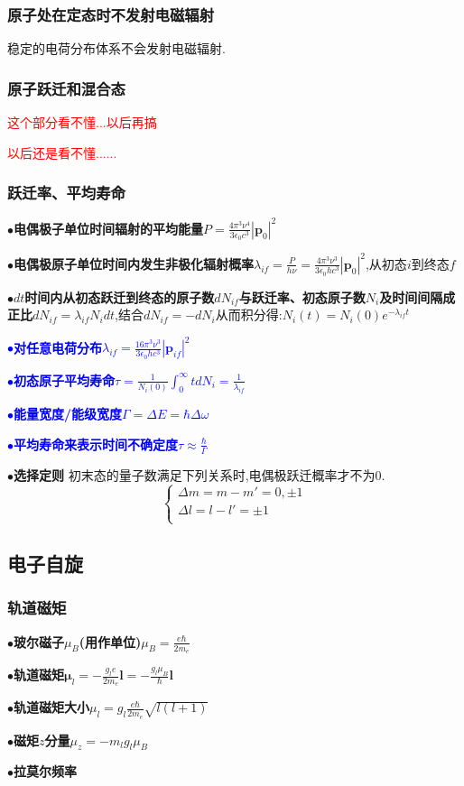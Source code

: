 \documentclass[UTF8]{article}
\newcommand{\keypoint}[2]{$\bullet$\textbf{#1}\quad#2\par}
\begin{document}
\subsubsection{原子处在定态时不发射电磁辐射}
稳定的电荷分布体系不会发射电磁辐射.\par
\subsubsection{原子跃迁和混合态}
%
%
\textcolor{red}{这个部分看不懂...以后再搞}\par
\textcolor{red}{以后还是看不懂......}\par
\subsubsection{跃迁率、平均寿命}
\keypoint{电偶极子单位时间辐射的平均能量}{$P=\frac{4\pi^3\nu^4}{3\epsilon_{0}c^3}\left|\bm{p}_0\right|^2$}
\keypoint{电偶极原子单位时间内发生非极化辐射概率}{$\lambda_{if}=\frac{P}{h\nu}=\frac{4\pi^3\nu^3}{3\epsilon_{0}hc^3}\left|\bm{p}_0\right|^2$,从初态$i$到终态$f$}
\keypoint{$dt$时间内从初态跃迁到终态的原子数$dN_{if}$与跃迁率、初态原子数$N_i$及时间间隔成正比}{$dN_{if}=\lambda_{if}N_idt$,结合$dN_{if}=-dN_i$从而积分得:{$N_i(t)=N_i(0)e^{-\lambda_{if}t}$}}
\textcolor{blue}{\keypoint{对任意电荷分布}{$\lambda_{if}=\frac{16\pi^3\nu^3}{3\epsilon_0hc^3}|\bm{p}_{if}|^2$}}
\textcolor{blue}{\keypoint{初态原子平均寿命}{$\tau=\frac{1}{N_i(0)}\int_{0}^{\infty}tdN_i=\frac{1}{\lambda_{if}}$}}
\textcolor{blue}{\keypoint{能量宽度/能级宽度}{$\Gamma=\Delta E=\hbar\Delta\omega$}}
\textcolor{blue}{\keypoint{平均寿命来表示时间不确定度}{$\tau\approx\frac{\hbar}{\Gamma}$}}
\keypoint{\textbf{选择定则}}{
	初末态的量子数满足下列关系时,电偶极跃迁概率才不为0.
	$$ \left\{
	\begin{array}{l}
	\Delta m = m-m'=0,\pm1\\
	\Delta l = l-l'=\pm1\\
	\end{array}
	\right .$$
}

\subsection{电子自旋}
\subsubsection{轨道磁矩}
\keypoint{玻尔磁子$\mu_{B}$(用作单位)}{$\mu_{B}=\frac{e\hbar}{2m_e}$}
\keypoint{轨道磁矩}{$\bm{\mu}_{l}=-\frac{g_le}{2m_e}\bm{l}=-\frac{g_l\mu_B}{\hbar}\bm{l}$}
\keypoint{轨道磁矩大小}{$\mu_{l}=g_l\frac{e\hbar}{2m_e}\sqrt{l(l+1)}$}
\keypoint{磁矩$z$分量}{$\mu_z=-m_lg_l\mu_B$}
\keypoint{拉莫尔频率}{}
\end{document}
